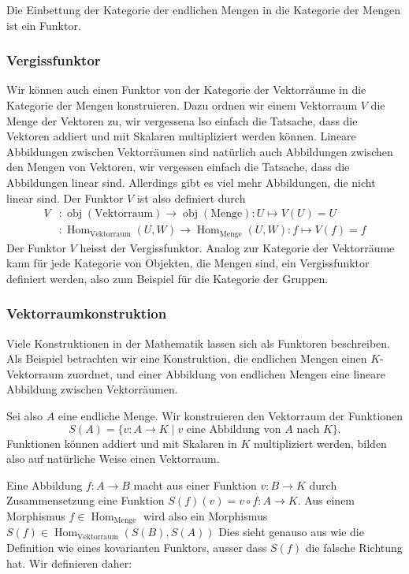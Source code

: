 Die Einbettung der Kategorie der endlichen Mengen in die Kategorie der
Mengen ist ein Funktor.

\subsubsection{Vergissfunktor}
Wir können auch einen Funktor von der Kategorie der Vektorräume in die
Kategorie der Mengen konstruieren.
Dazu ordnen wir einem Vektorraum $V$ die Menge der Vektoren zu, 
wir vergessena lso einfach die Tatsache, dass die Vektoren addiert und
mit Skalaren multipliziert werden können.
Lineare Abbildungen zwischen Vektorräumen sind natürlich auch Abbildungen
zwischen den Mengen von Vektoren, wir vergessen einfach die Tatsache,
dass die Abbildungen linear sind.
Allerdings gibt es viel mehr Abbildungen, die nicht linear sind.
Der Funktor $V$ ist also definiert durch
\begin{align*}
V
&\colon
\operatorname{obj}(\text{Vektorraum})
\to
\operatorname{obj}(\text{Menge})
:
U\mapsto V(U)=U\\
&\colon
\operatorname{Hom}_{\text{Vektorraum}}(U,W)
\to
\operatorname{Hom}_{\text{Menge}}(U,W)
:
f\mapsto V(f)=f
\end{align*}
Der Funktor $V$ heisst der Vergissfunktor.
Analog zur Kategorie der Vektorräume kann für jede Kategorie von Objekten,
die Mengen sind, ein Vergissfunktor definiert werden, also zum Beispiel
für die Kategorie der Gruppen.

\subsubsection{Vektorraumkonstruktion}
Viele Konstruktionen in der Mathematik lassen sich als Funktoren
beschreiben.
Als Beispiel betrachten wir eine Konstruktion, die endlichen Mengen
einen $K$-Vektorraum zuordnet, und einer Abbildung von endlichen Mengen
eine lineare Abbildung zwischen Vektorräumen.

Sei also $A$ eine endliche Menge.
Wir konstruieren den Vektorraum der Funktionen
\[
S(A) = \{v\colon A\to K\;|\;\text{$v$ eine Abbildung von $A$ nach $K$}\}.
\]
Funktionen können addiert und mit Skalaren in $K$ multipliziert werden,
bilden also auf natürliche Weise einen Vektorraum.

Eine Abbildung $f\colon A\to B$ macht aus einer Funktion $v\colon B\to K$
durch Zusammensetzung eine Funktion $S(f)(v)=v\circ f\colon A\to K$.
Aus einem Morphismus $f\in\operatorname{Hom}_{\text{Menge}}$ wird also 
ein Morphismus
$S(f)\in\operatorname{Hom}_{\text{Vektorraum}}(S(B),S(A))$
Dies sieht genauso aus wie die Definition wie eines kovarianten Funktors,
ausser dass $S(f)$ die falsche Richtung hat.
Wir definieren daher:


